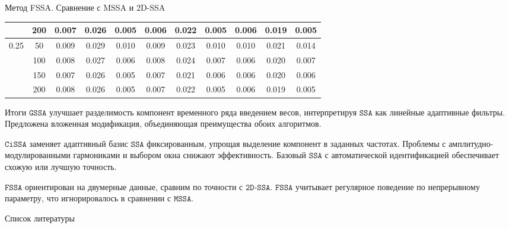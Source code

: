 \documentclass[notheorems, handout]{beamer}
\theoremstyle{definition}
\newcommand{\SSA}{\texttt{SSA}}
\newcommand{\GSSA}{\texttt{GSSA}}
\newcommand{\CISSA}{\texttt{CiSSA}}
\newcommand{\FSSA}{\texttt{FSSA}}
\newcommand{\DSSA}{\texttt{2D-SSA}}
\newcommand{\MSSA}{\texttt{MSSA}}
\begin{document}
\begin{frame}{Метод FSSA. Сравнение с MSSA и 2D-SSA}
\begin{table}[H]
{\begin{tabular}{c|c|ccc|ccc|ccc}
		                              & 200                      & 0.007                       & 0.026                       & 0.005                      & 0.006  & 0.022 & 0.005 & 0.006  & 0.019 & 0.005 \\
		\midrule
		\multirow{4}{*}{0.25}         & 50                       & 0.009                       & 0.029                       & 0.010                      & 0.009  & 0.023 & 0.010 & 0.010  & 0.021 & 0.014 \\
		                              & 100                      & 0.008                       & 0.027                       & 0.006                      & 0.008  & 0.024 & 0.007 & 0.006  & 0.020 & 0.007 \\
		                              & 150                      & 0.007                       & 0.026                       & 0.005                      & 0.007  & 0.021 & 0.006 & 0.006  & 0.020 & 0.006 \\
		                              & 200                      & 0.008                       & 0.026                       & 0.005                      & 0.007  & 0.022 & 0.005 & 0.006  & 0.019 & 0.005 \\
		\bottomrule
	\end{tabular}
	}
\end{table}
\end{frame}


\begin{frame}{Итоги}
	$\GSSA$ улучшает разделимость компонент временного ряда введением весов, интерпретируя $\SSA$ как линейные адаптивные фильтры. Предложена вложенная модификация, объединяющая преимущества обоих алгоритмов.

	\medskip
	$\CISSA$ заменяет адаптивный базис $\SSA$ фиксированным, упрощая выделение компонент в заданных частотах. Проблемы с амплитудно-модулированными гармониками и выбором окна снижают эффективность. Базовый $\SSA$ с автоматической идентификацией обеспечивает схожую или лучшую точность.

	\medskip
	$\FSSA$ ориентирован на двумерные данные, сравним по точности с $\DSSA$. $\FSSA$ учитывает регулярное поведение по непрерывному параметру, что игнорировалось в сравнении с $\MSSA$.
	
\end{frame}



\begin{frame}[allowframebreaks]{Список литературы}
	\printbibliography
\end{frame}
\end{document}
